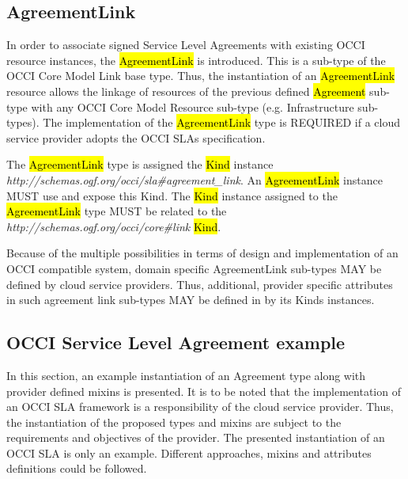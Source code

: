 \documentclass[10pt,a4paper]{article}
\begin{document}
\subsection{AgreementLink}
In order to associate signed Service Level Agreements with existing OCCI resource instances, the \hl{AgreementLink} is introduced. This is a sub-type of the OCCI Core Model Link base type. Thus, the instantiation of an \hl{AgreementLink} resource allows the linkage of resources of the previous defined \hl{Agreement} sub-type with any OCCI Core Model Resource sub-type (e.g. Infrastructure sub-types). The implementation of the \hl{AgreementLink} type is REQUIRED if a cloud service provider adopts the OCCI SLAs specification.

The \hl{AgreementLink} type is assigned the \hl{Kind} instance \textit{http://schemas.ogf.org/occi/sla\#agreement\_link}. An \hl{AgreementLink} instance MUST use and expose this Kind. The \hl{Kind} instance assigned to the \hl{AgreementLink} type MUST be related to the \textit{http://schemas.ogf.org/occi/core\#link} \hl{Kind}.

Because of the multiple possibilities in terms of design and implementation of an OCCI compatible system, domain specific AgreementLink sub-types MAY be defined by cloud service providers. Thus, additional, provider specific attributes in such agreement link sub-types MAY be defined in by its Kinds instances.


\subsection{OCCI Service Level Agreement example}

In this section, an example instantiation of an Agreement type along with provider defined mixins is presented. It is to be noted that the implementation of an OCCI SLA framework is a responsibility of the cloud service provider. Thus, the instantiation of the proposed types and mixins are subject to the requirements and objectives of the provider. The presented instantiation of an OCCI SLA is only an example. Different approaches, mixins and attributes definitions could be followed.
\end{document}
